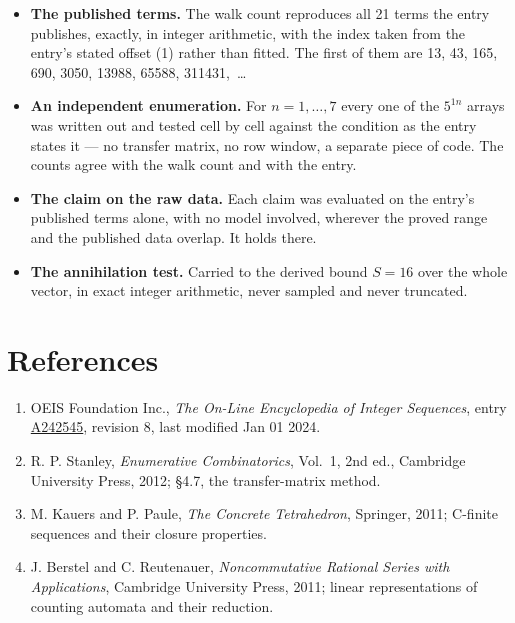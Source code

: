 \documentclass[11pt]{article}
\theoremstyle{definition}
\begin{document}
\begin{itemize}

\item {\bfseries The published terms.} The walk count reproduces all 21 terms the entry publishes, exactly, in integer arithmetic, with the index taken from the entry's stated offset (1) rather than fitted. The first of them are 13, 43, 165, 690, 3050, 13988, 65588, 311431,~\dots

\item {\bfseries An independent enumeration.} For $n = 1,\dots,7$ every one of the $5^{1n}$ arrays was written out and tested cell by cell against the condition as the entry states it --- no transfer matrix, no row window, a separate piece of code. The counts agree with the walk count and with the entry.

\item {\bfseries The claim on the raw data.} Each claim was evaluated on the entry's published terms alone, with no model involved, wherever the proved range and the published data overlap. It holds there.

\item {\bfseries The annihilation test.} Carried to the derived bound $S = 16$ over the whole vector, in exact integer arithmetic, never sampled and never truncated.

\end{itemize}

\section{References}

\begin{enumerate}

\item OEIS Foundation Inc., \emph{The On-Line Encyclopedia of Integer Sequences}, entry \href{https://oeis.org/A242545}{A242545}, revision 8, last modified Jan 01 2024.

\item R. P. Stanley, \emph{Enumerative Combinatorics}, Vol.~1, 2nd ed., Cambridge University Press, 2012; \S4.7, the transfer-matrix method.

\item M. Kauers and P. Paule, \emph{The Concrete Tetrahedron}, Springer, 2011; C-finite sequences and their closure properties.

\item J. Berstel and C. Reutenauer, \emph{Noncommutative Rational Series with Applications}, Cambridge University Press, 2011; linear representations of counting automata and their reduction.

\end{enumerate}
\end{document}
